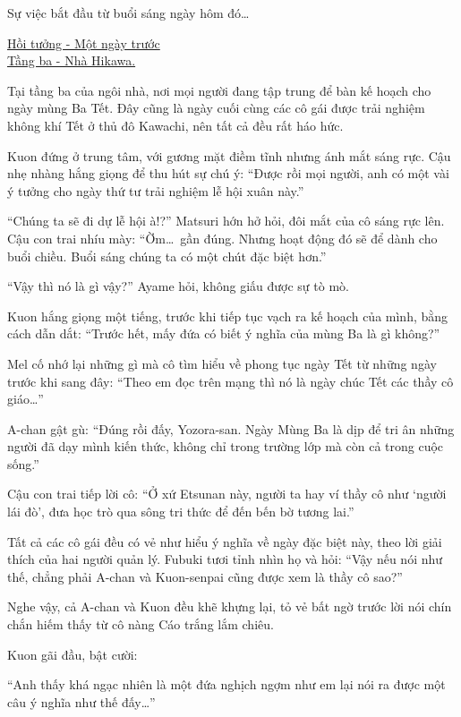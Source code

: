 \documentclass[../main.tex]{subfiles}
\begin{document}
Sự việc bắt đầu từ buổi sáng ngày hôm đó\dots

\begin{center}
    \uline{Hồi tưởng - Một ngày trước\\Tầng ba - Nhà Hikawa.}
\end{center}

Tại tầng ba của ngôi nhà, nơi mọi người đang tập trung để bàn kế hoạch cho ngày mùng Ba Tết. Đây cũng là ngày cuối cùng các cô gái được trải nghiệm không khí Tết ở thủ đô Kawachi, nên tất cả đều rất háo hức.

Kuon đứng ở trung tâm, với gương mặt điềm tĩnh nhưng ánh mắt sáng rực. Cậu nhẹ nhàng hắng giọng để thu hút sự chú ý: ``Được rồi mọi người, anh có một vài ý tưởng cho ngày thứ tư trải nghiệm lễ hội xuân này.''

``Chúng ta sẽ đi dự lễ hội à!?'' Matsuri hớn hở hỏi, đôi mắt của cô sáng rực lên. Cậu con trai nhíu mày: ``Ờm\dots\ gần đúng. Nhưng hoạt động đó sẽ để dành cho buổi chiều. Buổi sáng chúng ta có một chút đặc biệt hơn.''

``Vậy thì nó là gì vậy?'' Ayame hỏi, không giấu được sự tò mò.

Kuon hắng giọng một tiếng, trước khi tiếp tục vạch ra kế hoạch của mình, bằng cách dẫn dắt: ``Trước hết, mấy đứa có biết ý nghĩa của mùng Ba là gì không?''

Mel cố nhớ lại những gì mà cô tìm hiểu về phong tục ngày Tết từ những ngày trước khi sang đây: ``Theo em đọc trên mạng thì nó là ngày chúc Tết các thầy cô giáo\dots''

A-chan gật gù: ``Đúng rồi đấy, Yozora-san. Ngày Mùng Ba là dịp để tri ân những người đã dạy mình kiến thức, không chỉ trong trường lớp mà còn cả trong cuộc sống.''

Cậu con trai tiếp lời cô: ``Ở xứ Etsunan này, người ta hay ví thầy cô như `người lái đò', đưa học trò qua sông tri thức để đến bến bờ tương lai.''

Tất cả các cô gái đều có vẻ như hiểu ý nghĩa về ngày đặc biệt này, theo lời giải thích của hai người quản lý. Fubuki tươi tỉnh nhìn họ và hỏi: ``Vậy nếu nói như thế, chẳng phải A-chan và Kuon-senpai cũng được xem là thầy cô sao?''

Nghe vậy, cả A-chan và Kuon đều khẽ khựng lại, tỏ vẻ bất ngờ trước lời nói chín chắn hiếm thấy từ cô nàng Cáo trắng lắm chiêu.

Kuon gãi đầu, bật cười:

``Anh thấy khá ngạc nhiên là một đứa nghịch ngợm như em lại nói ra được một câu ý nghĩa như thế đấy\dots''
\end{document}

